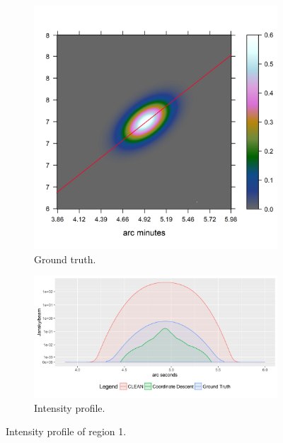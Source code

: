 \begin{figure}[h]
	\centering
	\begin{subfigure}[b]{0.3\linewidth}
		\includegraphics[width=\linewidth, trim={0.4in, 0.9in, 3.2in, 1.8in}, clip]{./chapters/20.results/mixed/mixed_cut_model_line.png}
		\caption{Ground truth.}
		\label{results:mixed:cut0:img}
	\end{subfigure}
	\begin{subfigure}[b]{0.6\linewidth}
		\includegraphics[width=\linewidth, trim={0, 0, 0.2in, 0.05in}, clip]{./chapters/20.results/mixed/mixed_cut0.png}
		\caption{Intensity profile.}
		\label{results:mixed:cut0:profile}
	\end{subfigure}
	\caption{Intensity profile of region 1.}
	\label{results:mixed:cut0:contour}
\end{figure}

